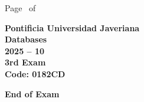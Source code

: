 \documentclass[11pt, addpoints, answers]{exam}\usepackage[utf8]{inputenc}
\begin{document}
\begin{coverpages}
\begin{center}
			\vspace{3mm}
			\leavevmode \hspace{5mm} 
		\end{center}
	\end{coverpages}

	\footer{} {Page \thepage\ of \numpages} {}

	\centering
	\textbf{\Large Pontificia Universidad Javeriana}\\
	\textbf{\Large Databases} \\
	\textbf{\large 2025 -- 10} \\
	\textbf{\large 3rd Exam} \\
	\textbf{Code: 0182CD}


	\begin{questions}
		
		
		
		
		
		
		
		
		
		
		
		
		
		
		
		
		
		
		
		
	\end{questions}

	\vspace{5mm}
	\noindent \textbf{End of Exam}
\end{document}
